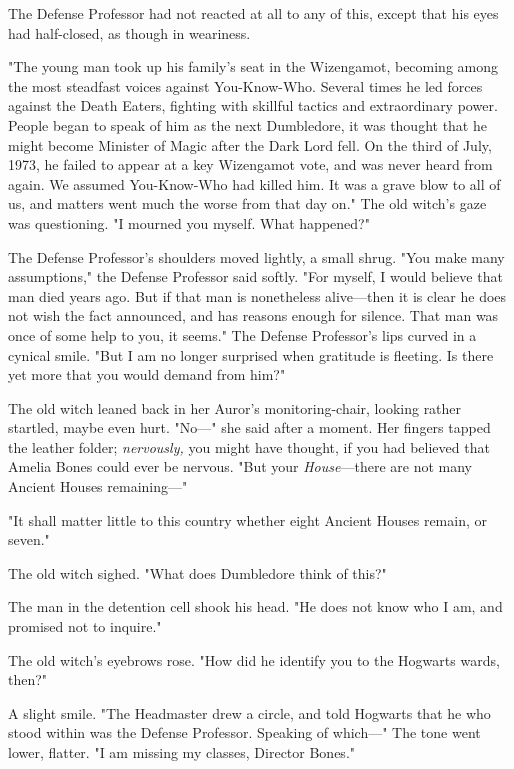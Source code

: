 The Defense Professor had not reacted at all to any of this, except that his 
eyes had half-closed, as though in weariness.

"The young man took up his family's seat in the Wizengamot, becoming among the 
most steadfast voices against You-Know-Who. Several times he led forces against 
the Death Eaters, fighting with skillful tactics and extraordinary power. 
People began to speak of him as the next Dumbledore, it was thought that he 
might become Minister of Magic after the Dark Lord fell. On the third of July, 
1973, he failed to appear at a key Wizengamot vote, and was never heard from 
again. We assumed You-Know-Who had killed him. It was a grave blow to all of 
us, and matters went much the worse from that day on." The old witch's gaze was 
questioning. "I mourned you myself. What happened?"

The Defense Professor's shoulders moved lightly, a small shrug. "You make many 
assumptions," the Defense Professor said softly. "For myself, I would believe 
that man died years ago. But if that man is nonetheless alive---then it is 
clear he does not wish the fact announced, and has reasons enough for silence. 
That man was once of some help to you, it seems." The Defense Professor's lips 
curved in a cynical smile. "But I am no longer surprised when gratitude is 
fleeting. Is there yet more that you would demand from him?"

The old witch leaned back in her Auror's monitoring-chair, looking rather 
startled, maybe even hurt. "No---" she said after a moment. Her fingers tapped 
the leather folder; \emph{nervously,} you might have thought, if you had 
believed that Amelia Bones could ever be nervous. "But your 
\emph{House}---there are not many Ancient Houses remaining---"

"It shall matter little to this country whether eight Ancient Houses remain, or 
seven."

The old witch sighed. "What does Dumbledore think of this?"

The man in the detention cell shook his head. "He does not know who I am, and 
promised not to inquire."

The old witch's eyebrows rose. "How did he identify you to the Hogwarts wards, 
then?"

A slight smile. "The Headmaster drew a circle, and told Hogwarts that he who 
stood within was the Defense Professor. Speaking of which---" The tone went 
lower, flatter. "I am missing my classes, Director Bones."

